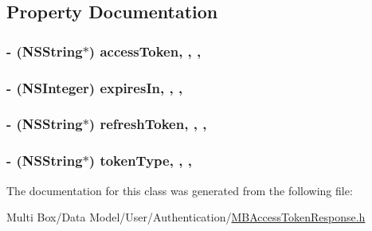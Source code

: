 \subsection{Property Documentation}
\hypertarget{interface_m_b_access_token_response_aae7d6df5c0e6da13e80b3ddb82ae7081}{
\subsubsection[{access\-Token}]{\setlength{\rightskip}{0pt plus 5cm}-\/ (N\-S\-String$\ast$) access\-Token\hspace{0.3cm}{\ttfamily [read]}, {\ttfamily [write]}, {\ttfamily [nonatomic]}, {\ttfamily [strong]}}}\label{interface_m_b_access_token_response_aae7d6df5c0e6da13e80b3ddb82ae7081}
\hypertarget{interface_m_b_access_token_response_ae251d07feaa95423629811e829c40f0a}{
\subsubsection[{expires\-In}]{\setlength{\rightskip}{0pt plus 5cm}-\/ (N\-S\-Integer) expires\-In\hspace{0.3cm}{\ttfamily [read]}, {\ttfamily [write]}, {\ttfamily [nonatomic]}, {\ttfamily [assign]}}}\label{interface_m_b_access_token_response_ae251d07feaa95423629811e829c40f0a}
\hypertarget{interface_m_b_access_token_response_a52a523200e9ed6203d66dc7250c725dd}{
\subsubsection[{refresh\-Token}]{\setlength{\rightskip}{0pt plus 5cm}-\/ (N\-S\-String$\ast$) refresh\-Token\hspace{0.3cm}{\ttfamily [read]}, {\ttfamily [write]}, {\ttfamily [nonatomic]}, {\ttfamily [strong]}}}\label{interface_m_b_access_token_response_a52a523200e9ed6203d66dc7250c725dd}
\hypertarget{interface_m_b_access_token_response_aebb1b1ab373299d1bbcb8edacfc117c2}{
\subsubsection[{token\-Type}]{\setlength{\rightskip}{0pt plus 5cm}-\/ (N\-S\-String$\ast$) token\-Type\hspace{0.3cm}{\ttfamily [read]}, {\ttfamily [write]}, {\ttfamily [nonatomic]}, {\ttfamily [strong]}}}\label{interface_m_b_access_token_response_aebb1b1ab373299d1bbcb8edacfc117c2}


The documentation for this class was generated from the following file\-:\begin{DoxyCompactItemize}
\item 
Multi Box/\-Data Model/\-User/\-Authentication/\hyperlink{_m_b_access_token_response_8h}{M\-B\-Access\-Token\-Response.\-h}\end{DoxyCompactItemize}
